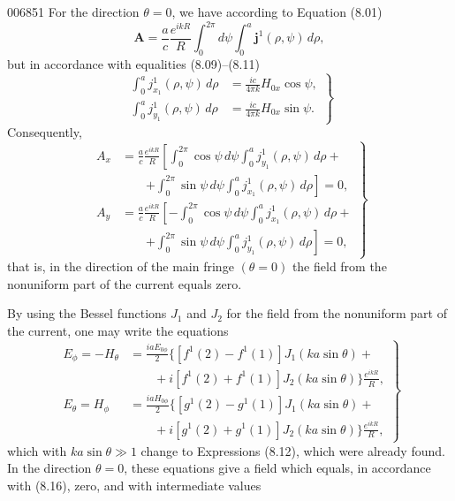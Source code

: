 \begin{scanpage}{0068}{51}
For the direction $\theta=0$, we have according to Equation (8.01)
\[\mathbf A=\frac ac\frac{e^{ikR}}R\int_0^{2\pi}d\psi\int_0^a\mathbf j^1(\rho,\psi)\,d\rho,\tag{8.14}\]
but in accordance with equalities (8.09)--(8.11)
\[\left.\begin{aligned}\int_0^a j_{x_1}^1(\rho,\psi)\,d\rho&=\frac{ic}{4\pi k}H_{0x}\cos\psi,\\\int_0^a j_{y_1}^1(\rho,\psi)\,d\rho&=\frac{ic}{4\pi k}H_{0x}\sin\psi.\end{aligned}\right\}\tag{8.15}\]
Consequently,
\[\left.\begin{aligned}A_x&=\frac ac\frac{e^{ikR}}R\left[\int_0^{2\pi}\cos\psi\,d\psi\int_0^a j_{y_1}^1(\rho,\psi)\,d\rho+\right.\\&\qquad\left.+\int_0^{2\pi}\sin\psi\,d\psi\int_0^a j_{x_1}^1(\rho,\psi)\,d\rho\right]=0,\\A_y&=\frac ac\frac{e^{ikR}}R\left[-\int_0^{2\pi}\cos\psi\,d\psi\int_0^a j_{x_1}^1(\rho,\psi)\,d\rho+\right.\\&\qquad\left.+\int_0^{2\pi}\sin\psi\,d\psi\int_0^a j_{y_1}^1(\rho,\psi)\,d\rho\right]=0,\end{aligned}\right\}\tag{8.16}\]
that is, in the direction of the main fringe $(\theta=0)$ the field from the nonuniform part of the current equals zero.

By using the Bessel functions $J_1$ and $J_2$ for the field from the nonuniform part of the current, one may write the equations
\[\left.\begin{aligned}E_\phi=-H_\theta&=\frac{iaE_{0\phi}}2\{[f^1(2)-f^1(1)]J_1(ka\sin\theta)+\\&\qquad+i[f^1(2)+f^1(1)]J_2(ka\sin\theta)\}\frac{e^{ikR}}R,\\E_\theta=H_\phi&=\frac{iaH_{0\phi}}2\{[g^1(2)-g^1(1)]J_1(ka\sin\theta)+\\&\qquad+i[g^1(2)+g^1(1)]J_2(ka\sin\theta)\}\frac{e^{ikR}}R,\end{aligned}\right\}\tag{8.17}\]
which with $ka\sin\theta\gg1$ change to Expressions (8.12), which were already found. In the direction $\theta=0$, these equations give a field which equals, in accordance with (8.16), zero, and with intermediate values
\end{scanpage}
